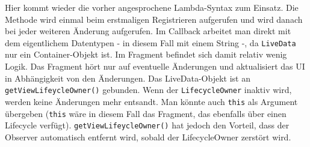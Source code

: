 \begin{Shaded}
\begin{Highlighting}[]
 
      \NormalTok{(} 

 \NormalTok{(}\NormalTok{);}

\NormalTok{(}\NormalTok{(),}
\NormalTok{         \});}
\NormalTok{\}}
\end{Highlighting}
\end{Shaded}

Hier kommt wieder die vorher angesprochene Lambda-Syntax zum Einsatz.
Die Methode wird einmal beim erstmaligen Registrieren aufgerufen und
wird danach bei jeder weiteren Änderung aufgerufen. Im Callback arbeitet
man direkt mit dem eigentlichem Datentypen - in diesem Fall mit einem
String -, da \texttt{LiveData} nur ein Container-Objekt ist. Im Fragment
befindet sich damit relativ wenig Logik. Das Fragment hört nur auf
eventuelle Änderungen und aktualisiert das UI in Abhängigkeit von den
Änderungen. Das LiveData-Objekt ist an \texttt{getViewLifeycleOwner()}
gebunden. Wenn der \texttt{LifecycleOwner} inaktiv wird, werden keine
Änderungen mehr entsandt. Man könnte auch \texttt{this} als Argument
übergeben (\texttt{this} wäre in diesem Fall das Fragment, das ebenfalls
über einen Lifecycle verfügt). \texttt{getViewLifeycleOwner()} hat
jedoch den Vorteil, dass der Observer automatisch entfernt wird, sobald
der LifecycleOwner zerstört wird.


